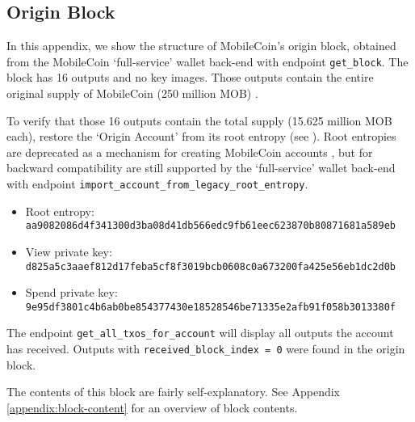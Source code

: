 \begin{appendices}
\chapter{Origin Block}
\label{appendix:origin-block}

In this appendix, we show the structure of MobileCoin's origin block, obtained from the MobileCoin `full-service' wallet back-end \cite{mobilecoin-full-service-source-code} with endpoint {\tt get\_block}. The block has 16 outputs and no key images. Those outputs contain the entire original supply of MobileCoin (250 million MOB) \cite{mobilecoin-governance-fees-supply}.

To verify that those 16 outputs contain the total supply (15.625 million MOB each), restore the `Origin Account' from its root entropy (see \cite{mobilecoin-governance-fees-supply}). Root entropies are deprecated as a mechanism for creating MobileCoin accounts \cite{mobilecoin-migration-to-mnemonics}, but for backward compatibility are still supported by the `full-service' wallet back-end \cite{mobilecoin-full-service-source-code} with endpoint {\tt import\_account\_from\_legacy\_root\_entropy}.

\begin{itemize}
    \item Root entropy: {\tt aa9082086d4f341300d3ba08d41db566edc9fb61eec623870b80871681a589eb}

    \item View private key: {\tt d825a5c3aaef812d17feba5cf8f3019bcb0608c0a673200fa425e56eb1dc2d0b}

    \item Spend private key: {\tt 9e95df3801c4b6ab0be854377430e18528546be71335e2afb91f058b3013380f}
\end{itemize}

The endpoint {\tt get\_all\_txos\_for\_account} will display all outputs the account has received. Outputs with {\tt received\_block\_index = 0} were found in the origin block.

The contents of this block are fairly self-explanatory. See Appendix \ref{appendix:block-content} for an overview of block contents.


\end{appendices}

